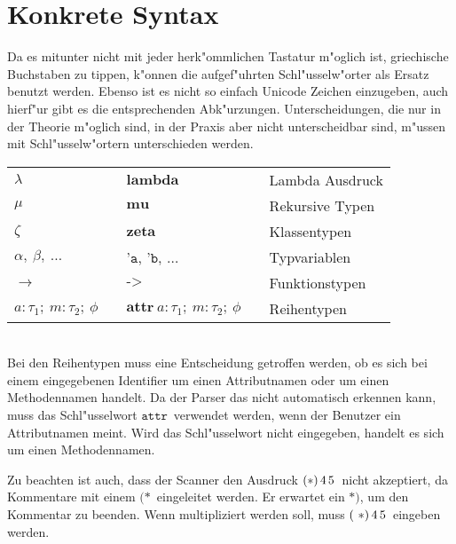 \section{Konkrete Syntax}
Da es mitunter nicht mit jeder herk"ommlichen Tastatur m"oglich ist, griechische Buchstaben zu tippen,
k"onnen die aufgef"uhrten Schl"usselw"orter als Ersatz benutzt werden. Ebenso ist es nicht so einfach
Unicode Zeichen einzugeben, auch hierf"ur gibt es die entsprechenden Abk"urzungen. Unterscheidungen,
die nur in der Theorie m"oglich sind, in der Praxis aber nicht unterscheidbar sind, m"ussen mit
Schl"usselw"ortern unterschieden werden.\\[5mm]
\begin{tabular}{lll}
  \mbox{$\lambda$}                            & $\textbf{lambda}$                        & Lambda Ausdruck\\
  \mbox{$\mu$}                                & $\textbf{mu}$                            & Rekursive Typen\\
  \mbox{$\zeta$}                              & $\textbf{zeta}$                          & Klassentypen\\
  \mbox{$\alpha,\ \beta,\ \ldots$}            & $\texttt{'a}$, $\texttt{'b}$, $\ldots$   & Typvariablen\\
  \mbox{$\to$}                                & $\texttt{->}$                            & Funktionstypen\\
  \mbox{$a: \tau_1;\ m: \tau_2;\ \phi \quad$} & $\textbf{attr}\ a: \tau_1;\ m: \tau_2;\ \phi \quad$
                                                                                         & Reihentypen\\
\end{tabular}\\[5mm]
Bei den Reihentypen muss eine Entscheidung getroffen werden, ob es sich bei einem eingegebenen Identifier
um einen Attributnamen oder um einen Methodennamen handelt. Da der Parser das nicht automatisch erkennen
kann, muss das Schl"usselwort \glqq$\texttt{attr}$\grqq\ verwendet werden, wenn der Benutzer ein 
Attributnamen meint. Wird das Schl"usselwort nicht eingegeben, handelt es sich um einen Methodennamen.

Zu beachten ist auch, dass der Scanner den Ausdruck \glqq$(*)\,4\,5$\grqq\ nicht akzeptiert,
da Kommentare mit einem \glqq$(*$\grqq\ eingeleitet werden. Er erwartet ein \glqq$*)$\grqq,
um den Kommentar zu beenden. Wenn multipliziert werden soll, muss \glqq$(\ *)\,4\,5$\grqq\ 
eingeben werden.


